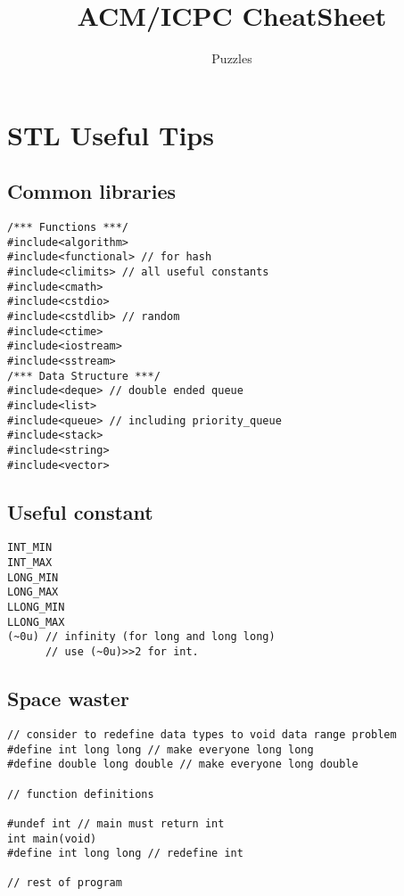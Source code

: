 \documentclass[a4paper]{article}
\title{\textbf{ACM/ICPC CheatSheet}}
\author{Puzzles}
\date{}
\begin{document}
\maketitle
\thispagestyle{empty}
	
{\footnotesize\tableofcontents}

\section{STL Useful Tips}

\subsection{Common libraries}
\begin{verbatim}
/*** Functions ***/
#include<algorithm>
#include<functional> // for hash
#include<climits> // all useful constants
#include<cmath>
#include<cstdio>
#include<cstdlib> // random
#include<ctime>
#include<iostream>
#include<sstream>
/*** Data Structure ***/
#include<deque> // double ended queue
#include<list>
#include<queue> // including priority_queue
#include<stack>
#include<string>
#include<vector>
\end{verbatim}

\subsection{Useful constant}

\begin{verbatim}
INT_MIN
INT_MAX
LONG_MIN
LONG_MAX
LLONG_MIN
LLONG_MAX
(~0u) // infinity (for long and long long)
      // use (~0u)>>2 for int.
\end{verbatim}

\subsection{Space waster}

\begin{verbatim}
// consider to redefine data types to void data range problem
#define int long long // make everyone long long
#define double long double // make everyone long double

// function definitions

#undef int // main must return int
int main(void)
#define int long long // redefine int

// rest of program
\end{verbatim}
\end{document}
